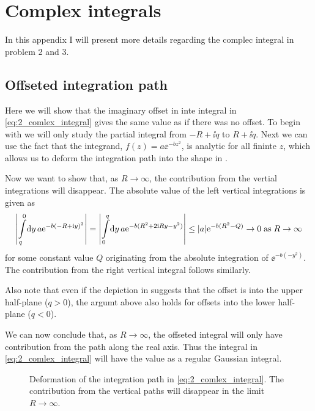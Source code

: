 \documentclass[11pt,letter, swedish, english
]{article}
\renewcommand{\thesubsection}{\arabic{section} (\alph{subsection})}
\begin{document}
\newpage
\appendix
\renewcommand{\thesubsection}{\Alph{section}.\arabic{subsection}}
\section{Complex integrals}
In this appendix I will present more details regarding the complec
integral in problem 2 and 3. 

\subsection{Offseted integration path}\label{sec:offset}
Here we will show that the  imaginary offset in inte integral in
\eqref{eq:2_comlex_integral} gives the same value as if there was no
offset. To begin with we will only study the partial integral from
$-R+\ii q$ to $R+\ii q$. Next we can use the fact that the
integrand, $f(z)=a\ee^{-bz^2}$, is analytic for all fininte $z$, which
allows us to deform the integration path into the shape in
.

Now we want to show that, as $R\to\infty$, the contribution from the
vertial integrations will disappear. The absolute value of the
left vertical integrations is given as
\begin{equation}
\abs{\int_{q}^0\!\rd{y}\,a\ee^{-b(-R+\ii y)^2}}
=\abs{\int_{0}^q\!\rd{y}\,a\ee^{-b(R^2+2\ii Ry - y^2)}}
\le\abs{a}\ee^{-b(R^2-Q)}\to0\;\text{as}\;R\to\infty
\end{equation}
for some constant value $Q$ originating from the absolute integration
of $\ee^{-b(-y^2)}$. The contribution from the right vertical integral
follows similarly. 

Also note that even if the depiction in 
suggests that the offset is into the upper half-plane ($q>0$), the argumt
above also holds for offsets into the lower half-plane ($q<0$).

We can now conclude that, as $R\to\infty$, the offseted integral will
only have contribution from the path along the real axis. Thus the
integral in \eqref{eq:2_comlex_integral} will have the value as a
regular Gaussian integral.

\begin{figure}\centering
\resizebox{.5\textwidth}{!}{}
\caption{Deformation of the integration path in
  \eqref{eq:2_comlex_integral}. The contribution from the vertical
  paths will disappear in the limit $R\to\infty$.}
\label{fig:int_path_2}
\end{figure}
\end{document}
